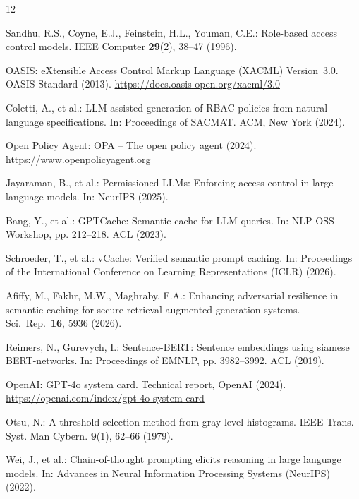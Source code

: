 \documentclass[runningheads]{llncs}
\begin{document}
%
%
%
% 
% 
%
\begin{thebibliography}{12}

Sandhu, R.S., Coyne, E.J., Feinstein, H.L., Youman, C.E.: Role-based
access control models. IEEE Computer \textbf{29}(2), 38--47 (1996).

OASIS: eXtensible Access Control Markup Language (XACML) Version~3.0.
OASIS Standard (2013). \url{https://docs.oasis-open.org/xacml/3.0}

Coletti, A., et al.: LLM-assisted generation of RBAC policies from
natural language specifications. In: Proceedings of SACMAT.
ACM, New York (2024).

Open Policy Agent: OPA -- The open policy agent (2024).
\url{https://www.openpolicyagent.org}

Jayaraman, B., et al.: Permissioned {LLM}s: Enforcing access control
in large language models. In: NeurIPS (2025).

Bang, Y., et al.: GPTCache: Semantic cache for LLM queries.
In: NLP-OSS Workshop, pp. 212--218. ACL (2023).

Schroeder, T., et al.: vCache: Verified semantic prompt caching.
In: Proceedings of the International Conference on Learning
Representations (ICLR) (2026).

Afiffy, M., Fakhr, M.W., Maghraby, F.A.: Enhancing adversarial
resilience in semantic caching for secure retrieval augmented
generation systems. Sci.\ Rep.\ \textbf{16}, 5936 (2026).

Reimers, N., Gurevych, I.: Sentence-BERT: Sentence embeddings using
siamese BERT-networks. In: Proceedings of EMNLP, pp. 3982--3992.
ACL (2019).

OpenAI: GPT-4o system card. Technical report, OpenAI (2024).
\url{https://openai.com/index/gpt-4o-system-card}

Otsu, N.: A threshold selection method from gray-level histograms.
IEEE Trans. Syst. Man Cybern. \textbf{9}(1), 62--66 (1979).

Wei, J., et al.: Chain-of-thought prompting elicits reasoning in
large language models. In: Advances in Neural Information Processing Systems (NeurIPS) (2022).

\end{thebibliography}
\end{document}
